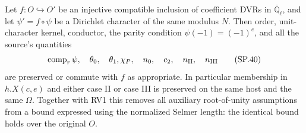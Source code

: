 \begin{proposition}
\label{claim:SP8}
Let $f:O\hookrightarrow O'$ be an injective compatible inclusion of
coefficient DVRs in $\overline{\mathbb Q}_\ell$, and let
$\psi' = f\circ\psi$ be a Dirichlet character of the same modulus
$N$.  Then order, unit-character kernel, conductor, the parity
condition $\psi(-1)=(-1)^e$, and all the source's quantities
\[
          \operatorname{comp}_r\psi,\quad\theta_0,\quad\theta_1,
          \chi_P,\quad n_0,\quad c_2,\quad n_{\rm II},\quad n_{\rm III}
 \tag{SP.40}
\]
are preserved or commute with $f$ as appropriate.  In particular
membership in $h.X(c,e)$ and either case II or case III is preserved
on the same host and the same $\Omega$.
Together with RV1 this removes all auxiliary root-of-unity
assumptions from a bound expressed using the normalized Selmer
length: the identical bound holds over the original $O$.
\end{proposition}

